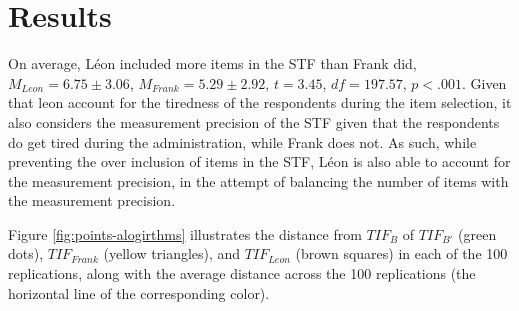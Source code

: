 \documentclass{svproc}
\begin{document}
\section{Results}

%

On average, Léon included more items in the STF than Frank did, $M_{Leon} = 6.75 \pm 3.06$, $M_{Frank} = 5.29 \pm 2.92$, $t = 3.45$, $df = 197.57$, $p < .001$. 
\color{red}
Given that leon account for the tiredness of the respondents during the item selection, it also considers the measurement precision of the STF given that the respondents do get tired during the administration, while Frank does not. As such, while preventing the over inclusion of items in the STF, Léon is also able to account for the measurement precision, in the attempt of balancing the number of items with the measurement precision.
\normalcolor

Figure \ref{fig:points-alogirthms} illustrates the distance from $TIF_B$ of  $TIF_{B'}$ (green dots), $TIF_{Frank}$ (yellow triangles), and $TIF_{Leon}$ (brown squares) in each of the 100 replications, along with the average distance across the 100 replications (the horizontal line of the corresponding color).
\end{document}
